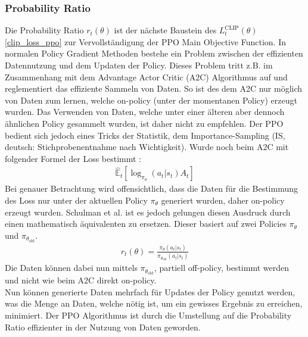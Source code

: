 \subsubsection{Probability Ratio} \label{sec:Probability_Ratio}
Die Probability Ratio $r_{t}(\theta)$ ist der nächste Baustein des $L^\text{CLIP}_{t} (\theta)$ \ref{clip_loss_ppo} zur Vervollständigung der PPO Main Objective Function. 
In normalen Policy Gradient Methoden bestehe ein Problem zwischen der effizienten Datennutzung und dem Updaten der Policy. Dieses Problem tritt z.B. im Zusammenhang mit dem Advantage Actor Critic (A2C) Algorithmus auf und reglementiert das effiziente Sammeln von Daten. So ist des dem A2C nur möglich von Daten zum lernen, welche on-policy (unter der momentanen Policy) erzeugt wurden. Das Verwenden von Daten, welche unter einer älteren aber dennoch ähnlichen Policy gesammelt wurden, ist daher nicht zu empfehlen.
Der PPO bedient sich jedoch eines Tricks der Statistik, dem Importance-Sampling (IS, deutsch: Stichprobenentnahme nach Wichtigkeit).
Wurde noch beim A2C mit folgender Formel der Loss bestimmt \cite[S. 591]{DRL_Lapan}:
\begin{align}
	\label{A2C_loss}
	\mathbb{\hat{E}}_t[\log_{\pi_{\theta}}(a_t|s_t)A_t]
\end{align}
Bei genauer Betrachtung wird offensichtlich, dass die Daten für die Bestimmung des Loss nur unter der aktuellen Policy $\pi_{\theta}$ generiert wurden, daher on-policy erzeugt wurden. Schulman et al. ist es jedoch gelungen diesen Ausdruck durch einen mathematisch äquivalenten zu ersetzen. Dieser basiert auf zwei Policies $\pi_{\theta}$ und $\pi_{\theta_{\text{old}}}$.
\begin{align}
	\label{eq:Probability_Ratio}
	r_{t}(\theta) = \frac{\pi_{\theta}(a_{t}|s_{t})}{\pi_{\theta_{\text{old}}}(a_{t}|s_{t})}
\end{align}
Die Daten können dabei nun mittels $\pi_{\theta_{\text{old}}}$, partiell off-policy, bestimmt werden und nicht wie beim A2C direkt on-policy. 
\cite[Zeitpunkt: 9:25]{Deep_RL_Bootcamp} \\
Nun können generierte Daten mehrfach für Updates der Policy genutzt werden, was die Menge an Daten, welche nötig ist, um ein gewisses Ergebnis zu erreichen, minimiert. Der PPO Algorithmus ist durch die Umstellung auf die Probability Ratio effizienter in der Nutzung von Daten geworden.

